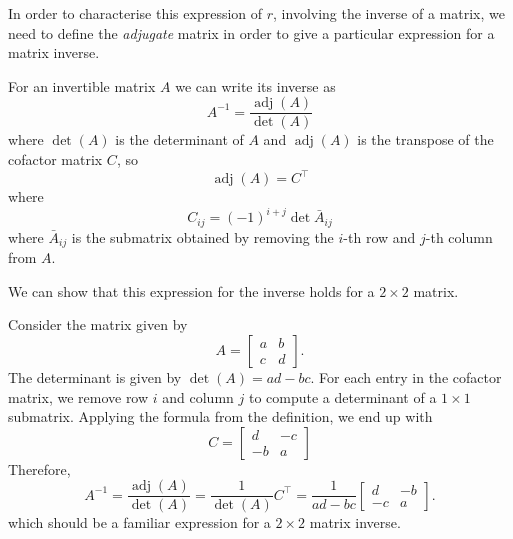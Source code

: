 In order to characterise this expression of $r$, involving the inverse of a matrix, we need to define the \textit{adjugate} matrix in order to give a particular expression for a matrix inverse.
\begin{definition}
	For an invertible matrix $A$ we can write its inverse as
	\begin{equation*}
		A^{-1} = \frac{\operatorname{adj}(A)}{\det(A)}
	\end{equation*}
	where $\det(A)$ is the determinant of $A$ and $\operatorname{adj}(A)$ is the transpose of the cofactor matrix $C$, so
	\begin{equation*}
		\operatorname{adj}(A) = C^\top
	\end{equation*}
	where
	\begin{equation*}
		C_{ij} = (-1)^{i+j}\det \bar{A}_{ij}
	\end{equation*}
	where $\bar{A}_{ij}$ is the submatrix obtained by removing the $i$-th row and $j$-th column from $A$.
\end{definition}
We can show that this expression for the inverse holds for a $2 \times 2$ matrix.
\begin{example}
	Consider the matrix given by
	\begin{equation*}
		A = \begin{bmatrix}
			a & b \\
			c & d
		\end{bmatrix}.
	\end{equation*}
	The determinant is given by $\det(A) = ad-bc$. For each entry in the cofactor matrix, we remove row $i$ and column $j$ to compute a determinant of a $1 \times 1$ submatrix.
	Applying the formula from the definition, we end up with
	\begin{equation*}
		C = \begin{bmatrix}
			d & -c \\
			-b & a
		\end{bmatrix}
	\end{equation*}
	Therefore,
	\begin{equation*}
		A^{-1} = \frac{\operatorname{adj}(A)}{\det(A)} = \frac{1}{\det(A)}C^\top = \frac{1}{ad-bc}\begin{bmatrix}
			d & -b \\
			-c & a
		\end{bmatrix}.
	\end{equation*}
	which should be a familiar expression for a $2 \times 2$ matrix inverse.
\end{example}

